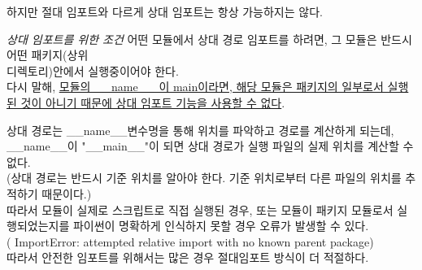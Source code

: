 하지만 절대 임포트와 다르게 상대 임포트는 항상 가능하지는 않다.
\begin{tcolorbox}[colback=black!15!white,colframe=black!15!white]
\textit{상대 임포트를 위한 조건} \newline
어떤 모듈에서 상대 경로 임포트를 하려면, 그 모듈은 반드시 어떤 패키지(상위 \\디렉토리)안에서 실행중이어야 한다. \\
다시 말해, \uline{모듈의 \_\_name\_\_ 이 main이라면, 해당 모듈은 패키지의 일부로서 실행된 것이 아니기 때문에 상대 임포트 기능을 사용할 수 없다}.
\end{tcolorbox}
상대 경로는 \_\_name\_\_변수명을 통해 위치를 파악하고 경로를 계산하게 되는데, \\\_\_name\_\_이 "\_\_main\_\_"이 되면 상대 경로가 실행 파일의 실제 위치를  계산할 수 없다. \\
(상대 경로는 반드시 기준 위치를 알아야 한다. 기준 위치로부터 다른 파일의 위치를 추적하기 때문이다.)\\
따라서 모듈이 실제로 스크립트로 직접 실행된 경우, 또는 모듈이 패키지 모듈로서 실행되었는지를 파이썬이 명확하게 인식하지 못할 경우 오류가 발생할 수 있다.\\
( ImportError: attempted relative import with no known parent package)\\
따라서 안전한 임포트를 위해서는 많은 경우 절대임포트 방식이 더 적절하다.



